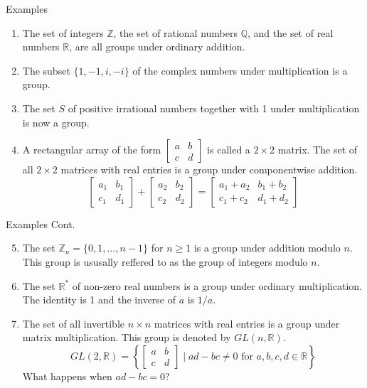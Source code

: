 \documentclass{beamer}
\begin{document}
\begin{frame}{Examples}
    \begin{enumerate}
        \item The set of integers \(\mathbb{Z}\), the set of rational numbers \(\mathbb{Q}\), and the set of real numbers \(\mathbb{R}\), are all groups under ordinary addition.\pause
        \item The subset \(\{1,-1, i, -i\}\) of the complex numbers under multiplication is a group. \pause
        \item The set \(S\) of positive irrational numbers together with 1 under multiplication is now a group.\pause
        \item A rectangular array of the form \(\begin{bmatrix}
            a & b\\
            c & d
        \end{bmatrix}\) is called a \(2\times 2\) matrix. The set of all \(2\times 2\) matrices with real entries is a group under componentwise addition. \[
        \begin{bmatrix}
            a_1 & b_1\\
            c_1 & d_1
        \end{bmatrix} + \begin{bmatrix}
            a_2 & b_2\\
            c_2 & d_2
        \end{bmatrix} = \begin{bmatrix}
            a_1 + a_2 & b_1 + b_2\\
            c_1 + c_2 & d_1 + d_2
        \end{bmatrix}
        \]
    \end{enumerate}
\end{frame}

\begin{frame}{Examples Cont.}
    \begin{enumerate}
        \setcounter{enumi}{4}
        \item The set \(\mathbb{Z}_n =\{0,1, \dots, n-1\}\) for \(n \geq 1\) is a group under addition modulo \(n\). This group is ususally reffered to as the group of integers modulo \(n\). \pause
        \item The set \(\mathbb{R}^*\) of non-zero real numbers is a group under ordinary multiplication. The identity is 1 and the inverse of \(a\) is \(1/a\). \pause
        \item The set of all invertible \(n\times n\) matrices with real entries is a group under matrix multiplication. This group is denoted by \(GL(n,\mathbb{R})\). 
        \[
        GL(2, \mathbb{R}) = \left\{ \begin{bmatrix}
            a & b\\
            c & d
        \end{bmatrix} \mid ad-bc \neq 0 \text{ for } a,b,c,d \in \mathbb{R}\right\}
        \]\pause
        What happens when \(ad-bc=0\)?
    \end{enumerate}
    
\end{frame}
\end{document}
